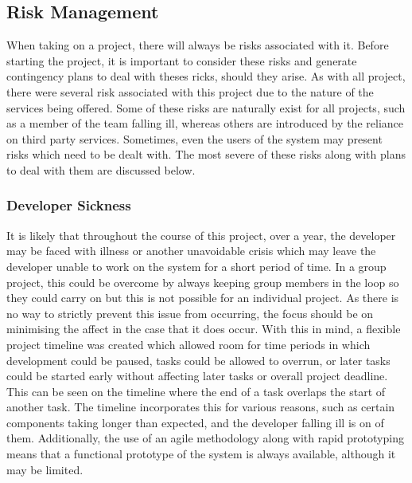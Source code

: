 \subsection{Risk Management}
When taking on a project, there will always be risks associated with it. Before starting the project, it is important to consider these risks and generate contingency plans to deal with theses ricks, should they arise. As with all project, there were several risk associated with this project due to the nature of the services being offered. Some of these risks are naturally exist for all projects, such as a member of the team falling ill, whereas others are introduced by the reliance on third party services. Sometimes, even the users of the system may present risks which need to be dealt with. The most severe of these risks along with plans to deal with them are discussed below.

\subsubsection{Developer Sickness}
It is likely that throughout the course of this project, over a year, the developer may be faced with illness or another unavoidable crisis which may leave the developer unable to work on the system for a short period of time. In a group project, this could be overcome by always keeping group members in the loop so they could carry on but this is not possible for an individual project. As there is no way to strictly prevent this issue from occurring, the focus should be on minimising the affect in the case that it does occur. With this in mind, a flexible project timeline was created which allowed room for time periods in which development could be paused, tasks could be allowed to overrun, or later tasks could be started early without affecting later tasks or overall project deadline. This can be seen on the timeline where the end of a task overlaps the start of another task. The timeline incorporates this for various reasons, such as certain components taking longer than expected, and the developer falling ill is on of them. Additionally, the use of an agile methodology along with rapid prototyping means that a functional prototype of the system is always available, although it may be limited.

